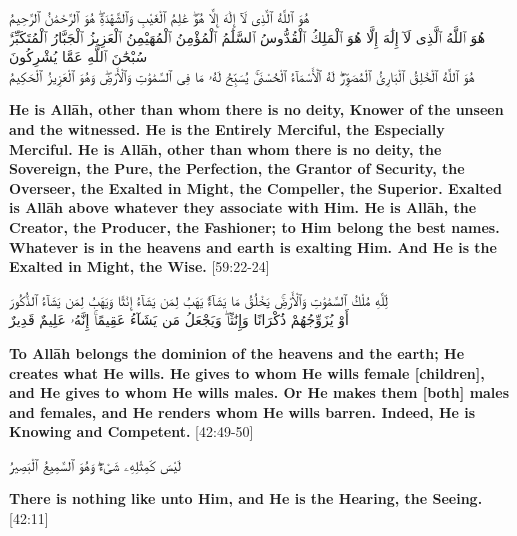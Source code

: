 \begin{center}
    \begin{RLtext}
        هُوَ ٱللَّهُ ٱلَّذِى لَآ إِلَٰهَ إِلَّا هُوَۖ عَٰلِمُ ٱلْغَيْبِ وَٱلشَّهَٰدَةِۖ هُوَ    ٱلرَّحْمَٰنُ ٱلرَّحِيمُ \\
        هُوَ ٱللَّهُ ٱلَّذِى لَآ إِلَٰهَ إِلَّا هُوَ ٱلْمَلِكُ ٱلْقُدُّوسُ ٱلسَّلَٰمُ ٱلْمُؤْمِنُ    ٱلْمُهَيْمِنُ ٱلْعَزِيزُ ٱلْجَبَّارُ ٱلْمُتَكَبِّرُۚ سُبْحَٰنَ ٱللَّهِ عَمَّا يُشْرِكُونَ \\
        هُوَ ٱللَّهُ ٱلْخَٰلِقُ ٱلْبَارِئُ ٱلْمُصَوِّرُۖ لَهُ ٱلْأَسْمَآءُ ٱلْحُسْنَىٰۚ يُسَبِّحُ لَهُۥ مَا فِى ٱلسَّمَٰوَٰتِ وَٱلْأَرْضِۖ وَهُوَ ٱلْعَزِيزُ ٱلْحَكِيمُ 
    \end{RLtext}
\end{center}
\textbf{He is Allāh, other than whom there is no deity, Knower of the unseen and the witnessed. He is the Entirely Merciful, the Especially Merciful. He is Allāh, other than whom there is no deity, the Sovereign, the Pure, the Perfection, the Grantor of Security, the Overseer, the Exalted in Might, the Compeller, the Superior. Exalted is Allāh above whatever they associate with Him. He is Allāh, the Creator, the Producer, the Fashioner; to Him belong the best names. Whatever is in the heavens and earth is exalting Him. And He is the Exalted in Might, the Wise.} [59:22-24]

\begin{center}
    \begin{RLtext}
        لِّلَّهِ مُلْكُ ٱلسَّمَٰوَٰتِ وَٱلْأَرْضِۚ يَخْلُقُ مَا يَشَآءُۚ يَهَبُ لِمَن يَشَآءُ إِنَٰثًا وَيَهَبُ لِمَن يَشَآءُ ٱلذُّكُورَ \\
        أَوْ يُزَوِّجُهُمْ ذُكْرَانًا وَإِنَٰثًاۖ وَيَجْعَلُ مَن يَشَآءُ عَقِيمًاۚ إِنَّهُۥ عَلِيمٌ قَدِيرٌ 
    \end{RLtext}
\end{center}
\textbf{To Allāh belongs the dominion of the heavens and the earth; He creates what He wills. He gives to whom He wills female [children], and He gives to whom He wills males. Or He makes them [both] males and females, and He renders whom He wills barren. Indeed, He is Knowing and Competent.} [42:49-50]

\begin{center}
    \begin{RLtext}
        لَيْسَ كَمِثْلِهِۦ شَىْءٌۖ وَهُوَ ٱلسَّمِيعُ ٱلْبَصِيرُ 
    \end{RLtext}
    \textbf{There is nothing like unto Him, and He is the Hearing, the Seeing.} [42:11]
\end{center}


